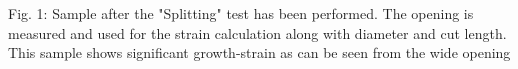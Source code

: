 Fig. 1: Sample after the "Splitting" test has been performed. The opening is measured and used for the strain calculation along with diameter and cut length. This sample shows significant growth-strain as can be seen from the wide opening